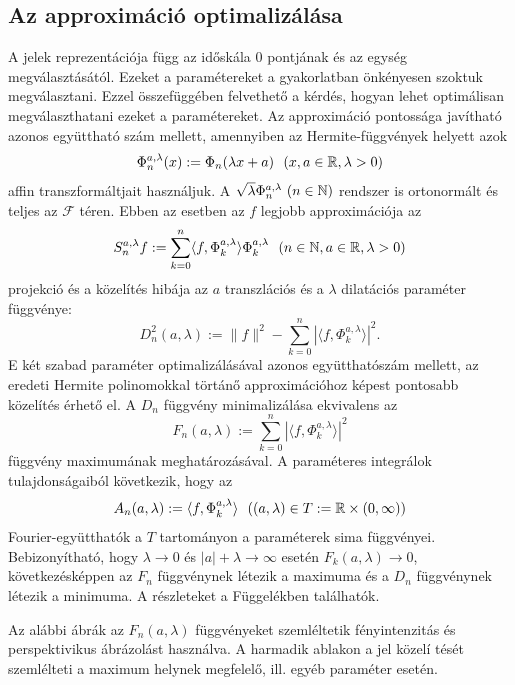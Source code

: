 \documentclass[oneside,titlepage,12pt,a4paper]{report}
\begin{document}
\subsection{Az approximáció optimalizálása}

A jelek reprezentációja  függ az időskála $0$ pontjának és az egység
megválasztásától. Ezeket a paramétereket  a gyakorlatban önkényesen szoktuk
 megválasztani. Ezzel összefüggében felvethető a kérdés, hogyan lehet optimálisan megválaszthatani  ezeket a paramétereket.
Az  approximáció pontossága javítható azonos együttható szám mellett, amennyiben az  Hermite-függvények helyett azok
\begin{equation}
\Phi_n^{a,\lambda}(x):=\Phi_n(\lambda x+a)\ \  (x,a\in\Bbb R, \lambda>0)
\end{equation}
affin transzformáltjait használjuk. A $\sqrt{\lambda}\Phi_n^{a,\lambda}\ (n\in\Bbb N)$ rendszer is ortonormált és teljes az $\mathcal F$ téren. Ebben az esetben
az $f$ legjobb approximációja az
\begin{equation}
S_n^{a,\lambda}f:=\sum_{k=0}^n\langle f,\Phi_k^{a,\lambda}\rangle\Phi_k^{a,\lambda}\ \
(n\in\Bbb N, a\in\Bbb R,\lambda>0)
\end{equation}
projekció és a közelítés hibája az $a$ transzlációs és a $\lambda$ dilatációs paraméter függvénye:
\begin{equation}
D^2_n(a,\lambda):=\|f\|^2-\sum_{k=0}^n|\langle f,\Phi_k^{a,\lambda}\rangle|^2.
\end{equation}
            E két szabad paraméter optimalizálásával azonos együtthatószám mellett, az eredeti Hermite polinomokkal törtánő  approximációhoz képest pontosabb közelítés érhető el. A $D_n$ függvény minimalizálása ekvivalens  az
 $$
 F_n(a,\lambda):=\sum_{k=0}^n|\langle f,\Phi_k^{a,\lambda}\rangle|^2
 $$
 függvény maximumának meghatározásával. A paraméteres integrálok tulajdonságaiból következik, hogy az
 $$
 A_n(a,\lambda):=\langle f,\Phi_k^{a,\lambda}\rangle \ \  ((a,\lambda)\in T:=\Bbb R\times (0,\infty))
 $$
 Fourier-együtthatók a $T$ tartományon a paraméterek sima függvényei. Bebizonyítható, hogy $\lambda\to 0$ és $|a|+\lambda\to \infty$ esetén
 $F_k(a,\lambda)\to 0$, következésképpen az $F_n$ függvénynek létezik a
 maximuma és a $D_n$ függvénynek létezik a minimuma. A részleteket a Függelékben találhatók.

 Az alábbi ábrák az $F_n(a,\lambda)$ függvényeket szemléltetik fényintenzitás és perspektivikus ábrázolást használva. A harmadik ablakon
a jel közelí tését szemlélteti a maximum helynek megfelelő, ill.  egyéb
paraméter esetén.
\end{document}
